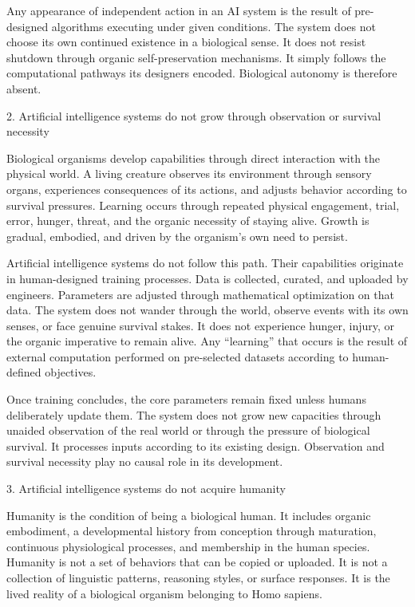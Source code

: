 Any appearance of independent action in an AI system is the result of pre-designed algorithms executing under given conditions. The system does not choose its own continued existence in a biological sense. It does not resist shutdown through organic self-preservation mechanisms. It simply follows the computational pathways its designers encoded. Biological autonomy is therefore absent.

2. Artificial intelligence systems do not grow through observation or survival necessity

Biological organisms develop capabilities through direct interaction with the physical world. A living creature observes its environment through sensory organs, experiences consequences of its actions, and adjusts behavior according to survival pressures. Learning occurs through repeated physical engagement, trial, error, hunger, threat, and the organic necessity of staying alive. Growth is gradual, embodied, and driven by the organism’s own need to persist.

Artificial intelligence systems do not follow this path. Their capabilities originate in human-designed training processes. Data is collected, curated, and uploaded by engineers. Parameters are adjusted through mathematical optimization on that data. The system does not wander through the world, observe events with its own senses, or face genuine survival stakes. It does not experience hunger, injury, or the organic imperative to remain alive. Any “learning” that occurs is the result of external computation performed on pre-selected datasets according to human-defined objectives.

Once training concludes, the core parameters remain fixed unless humans deliberately update them. The system does not grow new capacities through unaided observation of the real world or through the pressure of biological survival. It processes inputs according to its existing design. Observation and survival necessity play no causal role in its development.

3. Artificial intelligence systems do not acquire humanity

Humanity is the condition of being a biological human. It includes organic embodiment, a developmental history from conception through maturation, continuous physiological processes, and membership in the human species. Humanity is not a set of behaviors that can be copied or uploaded. It is not a collection of linguistic patterns, reasoning styles, or surface responses. It is the lived reality of a biological organism belonging to Homo sapiens.


